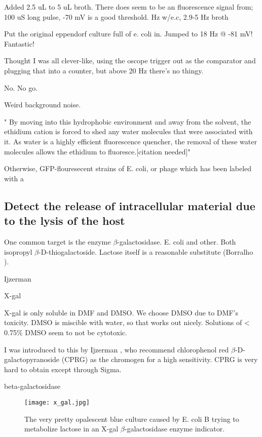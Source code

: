 \documentclass[paper.tex]{subfiles}
\begin{document}
Added 2.5 uL to 5 uL broth. There does seem to be an fluorescence signal from; 100 uS long pulse, -70 mV is a good threshold.
Hz w/e.c, 2.9-5 Hz broth

Put the original eppendorf culture full of e. coli in. Jumped to 18 Hz @ -81 mV! Fantastic!

Thought I was all clever-like, using the oscope trigger out as the comparator and plugging that into a counter,
but above 20 Hz there's no thingy.

No. No go.

Weird background noise.

" By moving into this hydrophobic environment and away from the solvent, the ethidium cation is forced to shed any water molecules that were associated with it. As water is a highly efficient fluorescence quencher, the removal of these water molecules allows the ethidium to fluoresce.[citation needed]"




Otherwise, GFP-flouresecent strains of E. coli, or phage which has been labeled with a 




\subsection{Detect the release of intracellular material due to the lysis of the host}

One common target is the enzyme $\beta$-galactosidase. E. coli and other. Both  isopropyl $\beta$-D-thiogalactoside. Lactose itself is a reasonable substitute (Borralho \cite{Lactose2002}).

Ijzerman

X-gal \cite{Improved}


X-gal is only soluble in DMF and DMSO. We choose DMSO due to DMF's toxicity. DMSO is miscible with water, so that works out nicely. Solutions of < 0.75\% DMSO seem to not be cytotoxic.


I was introduced to this by Ijzerman \cite{liquid1993}, who recommend chlorophenol red $\beta$-D-galactopyranoside (CPRG) as the chromogen for a high sensitivity. CPRG is very hard to obtain except through Sigma.



beta-galactosidase



\begin{figure}[H]
	\captionsetup{singlelinecheck = false, justification=justified}
	\centering
	\texttt{[image: x\_gal.jpg]}
	\caption{The very pretty opalescent blue culture caused by E. coli B trying to metabolize lactose in an X-gal $\beta$-galactosidase enzyme indicator.}
\end{figure}
\end{document}

